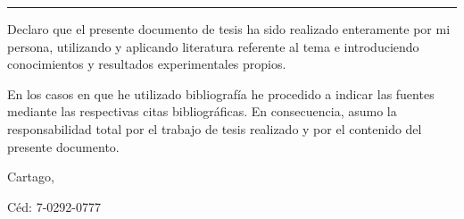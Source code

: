 \thispagestyle{empty}

\rule{10mm}{0pt}

\vfill

Declaro que el presente documento de tesis ha sido realizado enteramente
por mi persona, utilizando y aplicando literatura referente al tema e
introduciendo conocimientos y resultados experimentales propios.

En los casos en que he utilizado bibliografía he procedido a indicar las
fuentes mediante las respectivas citas bibliográficas.  En consecuencia,
asumo la responsabilidad total por el trabajo de tesis realizado y por
el contenido del presente documento.



\vspace*{8mm}

\begin{flushright}
  \thesisAuthor\par
  Cartago, %
  \ifdraft{%
      \thesisDraftDate%
  }{%
      \thesisFinalDate%
  }\par
  Céd: 7-0292-0777
\end{flushright}

\cleardoublepage

